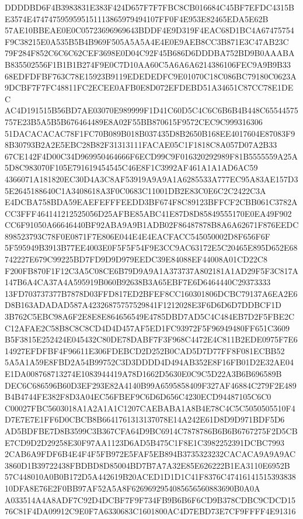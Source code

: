 \documentclass[UTF8,fontset=fandol,zihao=-4,a4paper]{ctexart}
\begin{document}
{{DDDDBD6F4B3983831E383F424D657F7F7FBC8CB016684C45BF7EFDC4315BE3574E4747475959595151113865979494107FF0F4E953E82465EDA5E62B
57AE10BBEAE0E0C05723696969643BDDF4E9D319F4EAC68D1BC4A67475754F9C38215E0A535B5B4B969F505A5A5A4E4E0E9AEB8CC3B871E3C47AB23C
79F284F852C6C6C62CEF3698E0D04C92F45B686D6DDDBA752BD9B0AAABAB835502556F1B1B1B274F9E0C7D10AA60C5A6A6A6214386106FEC9A9B9B33
68EDFDFBF763C78E15923B9119EDEDEDFC9E01070C18C086BC79180C0623A9DCBF7F7FC48811FC2ECEE0AFB0E8D072EFDEBD51A34651C87CC78E1DEC
AC4D191515B56BD7AE03070E989999F1D41C60D5C4C6C6B6B4B448C65544575757E23B5A5B5B676464489E8A02F55BB870615F9572CEC9C999316306
51DACACACAC78F1FC70B089B018B037435D8B2650B168EE4017604E87083F98B30793B2A2E5EBC28B82F31313111FACAE05C1F1818C8A057D07A2B33
67CE142F4D00C34D969950464666F6ECD99C9F016320292989F81B5555559A25A5D8C983070F105E791619454545C46E8F1C3992AF461A1A1AD6AC59
4366071A181820EC30D4A3C8AF53919A9A9A1A6285533A777EC95A83AE157D35E2645188640C1A3408618A3F0C0683C11001DB2E83C0E6C2C2422C3A
E4DCBA758BDA59EAEFEFFFEEDD3BF674F8C89123BFFCF2CBB061C3782ACC3FFF464141212525056D25AFBE85ABC41E87D8D85849555170E0EA49F902
CC6F91050A66646440BF92ABA9A9B1ADB02F86487878B8A6A62671F876EEDC898523793C78F0E0871F7E806E044E4E4EACFACC545050002D8F656F6F
5F595949B3913B77EE4003E0F5F5F54F9E3CC9AC63172E5C20465E895D652E68742227E679C99225BD7FD9D9D979EEDC39E84088EF44008A01CD22C8
F200FB870F1F12C3A5C08CE6B79D9A9A1A373737A802181A1AD29F5F3C817A147B6A4CA37A4A595919B060B92638B3A65EBF7E6D6464440C29373333
13FD703737377B7878D03FFD817ED2BFEF8CC160301806DCBC79137A6EA2E6D8B163ADADAD587A42326875757529841F1212028E3F6D6D6D7DDBCF1D
3B762C5EBC98A6F2E8E8E864656549E4785DBD7AD5C4C484EB7D2F5FBE2CC12AFAE2C58B8C8C8CD4D4D457AF5ED1FC93972F5F96949480FF651C3609
B5F3815E252424E045432C80DE78DABF7F3F968C4472E4C811B2EDE0975F7E614927EFDFBF4F96611E306FDEBCD2D252B0CAD5D7D77FF8F081ECBB52
5A5A1A59E8FBD2A54B99752C3D3DDDD4D494AB352E8F16FB01D2E32AE04E1DA008768713274E1083944419A78D1662D5630E0C9C5D22A3B6B696589B
DEC6C686596B60D3EF293E82A4140B99A6595858409F327AF46884C279F2E489B4B4744FE382F8D3A04EC56FBEF9C6D6D656C4230ECD94487105C6C0
C00027FBC5603018A1A2A1A1C1207CAEBABA1A8B4E78C4C5C5050505510F4D7E7E7E1FF6D0CBCB8B6641761313137078E14A242E61D8D9D971BDF5D6
AD5BDFBE7D8B3599C3B367CFA64D9BC6914C7878786B6B6B6767275F2D5CBE7CD9D2D29258E30F97AA1123D6AD5B475C1F8E1C3982252391DCBC7993
2CAB6A9FDF6B4E4F4F5FB972E5FAF5EB894B3735323232CACACA9A9A9AC3860D1B39722438FBDBD8D85004BD7B7A7A32E85E626222B1EA3110E6952B
57C448010A0B0B172D5A442619B20ACED1D1D1C41F8376C4741614151539383810DFA8E76E2F0BB97AF52A5A8F6269692954085656560883690B0A0A
A033514A4A8ADF7C92D4DCBF7F9F734FB9B6B6F6CD9B378CDBC9CDCD1576C81F4DA09912C9E0F7A6330683C1601800AC4D7EBD73E7CF9FFFF4E91316
}}
\end{document}
